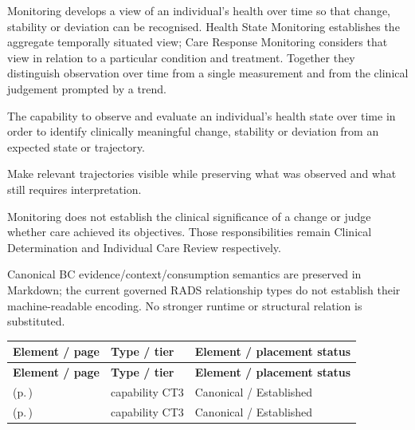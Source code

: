 Monitoring develops a view of an individual's health over time so that change, stability or deviation can be recognised. Health State Monitoring establishes the aggregate temporally situated view; Care Response Monitoring considers that view in relation to a particular condition and treatment. Together they distinguish observation over time from a single measurement and from the clinical judgement prompted by a trend.



The capability to observe and evaluate an individual's health state over time in order to identify clinically meaningful change, stability or deviation from an expected state or trajectory.



Make relevant trajectories visible while preserving what was observed and what still requires interpretation.



Monitoring does not establish the clinical significance of a change or judge whether care achieved its objectives. Those responsibilities remain Clinical Determination and Individual Care Review respectively.



Canonical BC evidence/\allowbreak{}context/\allowbreak{}consumption semantics are preserved in Markdown; the current governed RADS relationship types do not establish their machine-readable encoding. No stronger runtime or structural relation is substituted.


\begingroup\small\setlength{\TableWidth}{\dimexpr\linewidth-6\tabcolsep-4\arrayrulewidth\relax}
\begin{longtable}{|>{\raggedright\arraybackslash}p{0.52\TableWidth}|>{\raggedright\arraybackslash}p{0.2\TableWidth}|>{\raggedright\arraybackslash}p{0.28\TableWidth}|}
\hline\rowcolor{TableHead}\textbf{Element / page} & \textbf{Type / tier} & \textbf{Element / placement status}\\\hline\endfirsthead
\hline\rowcolor{TableHead}\textbf{Element / page} & \textbf{Type / tier} & \textbf{Element / placement status}\\\hline\endhead
\hline\endfoot
\nameref{cap:bc-health-state-monitoring} (p.\,\pageref{cap:bc-health-state-monitoring}) & capability CT3 & Canonical / Established\\\hline
\nameref{cap:bc-care-response-monitoring} (p.\,\pageref{cap:bc-care-response-monitoring}) & capability CT3 & Canonical / Established\\\hline
\end{longtable}\endgroup

